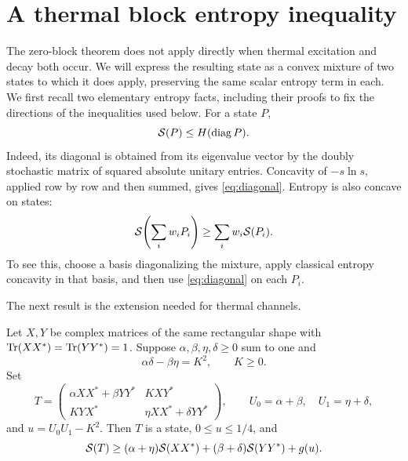 \section{A thermal block entropy inequality}\label{sec:thermal}

The zero-block theorem does not apply directly when thermal excitation
and decay both occur. We will express the resulting state as a convex
mixture of two states to which it does apply, preserving the same scalar
entropy term in each. We first recall two elementary entropy facts,
including their proofs to fix the directions of the inequalities used
below. For a state $P$,
\begin{equation}\label{eq:diagonal}
 \mathcal S(P)\le H(\operatorname{diag} P).
\end{equation}
Indeed, its diagonal is obtained from its eigenvalue vector by the
doubly stochastic matrix of squared absolute unitary entries.
Concavity of $-s\ln s$, applied row by row and then summed, gives
\eqref{eq:diagonal}. Entropy is also concave on states:
\begin{equation}\label{eq:concavity}
 \mathcal S\!\left(\sum_iw_iP_i\right)\ge\sum_iw_i\mathcal S(P_i).
\end{equation}
To see this, choose a basis diagonalizing the mixture, apply classical
entropy concavity in that basis, and then use \eqref{eq:diagonal} on
each $P_i$.

The next result is the extension needed for thermal channels.

\begin{theorem}\label{thm:thermal}
Let $X,Y$ be complex matrices of the same rectangular shape with
$\operatorname{Tr}(XX^*)=\operatorname{Tr}(YY^*)=1$. Suppose
$\alpha,\beta,\eta,\delta\ge0$ sum to one and
\begin{equation}\label{eq:thermal-condition}
 \alpha\delta-\beta\eta=K^2,\qquad K\ge0.
\end{equation}
Set
\begin{equation}\label{eq:thermal-state}
 T=\begin{pmatrix}
 \alpha XX^*+\beta YY^*&KXY^*\\
 KYX^*&\eta XX^*+\delta YY^*
 \end{pmatrix},\qquad
 U_0=\alpha+\beta,\quad U_1=\eta+\delta,
\end{equation}
and $u=U_0U_1-K^2$. Then $T$ is a state, $0\le u\le1/4$, and
\begin{equation}\label{eq:thermal-bound}
 \mathcal S(T)\ge(\alpha+\eta)\mathcal S(XX^*)
             +(\beta+\delta)\mathcal S(YY^*)+g(u).
\end{equation}
\end{theorem}

